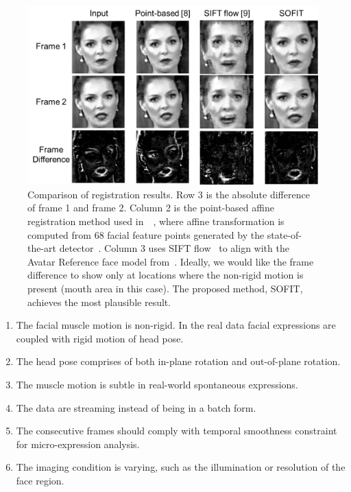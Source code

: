 \documentclass[10pt,journal]{IEEEtran}
\begin{document}
\begin{figure}[!t]
	\centering
		\includegraphics[width=\columnwidth]{fig/regComp.png}
	\caption{Comparison of registration results. Row 3 is the absolute difference of frame 1 and frame 2. Column 2 is the point-based affine registration method used in~\cite{Littlewort_CERT_FG2011}~\cite{Valstar_SMCB12}, where affine transformation is computed from 68 facial feature points generated by the state-of-the-art detector~\cite{Zhu_CVPR12}. Column 3 uses SIFT flow~\cite{Liu_PAMI11} to align with the Avatar Reference face model from~\cite{Yang_SMCB12}. Ideally, we would like the frame difference to show only at locations where the non-rigid motion is present (mouth area in this case). The proposed method, SOFIT, achieves the most plausible result.}
	\label{fig:regComp}
\end{figure}

\begin{enumerate}
\item The facial muscle motion is non-rigid. In the real data facial expressions are coupled with rigid motion of head pose.
\item The head pose comprises of both in-plane rotation and out-of-plane rotation.
\item The muscle motion is subtle in real-world spontaneous expressions.
\item The data are streaming instead of being in a batch form.
\item The consecutive frames should comply with temporal smoothness constraint for micro-expression analysis.
\item The imaging condition is varying, such as the illumination or resolution of the face region.
\end{enumerate}
\end{document}
